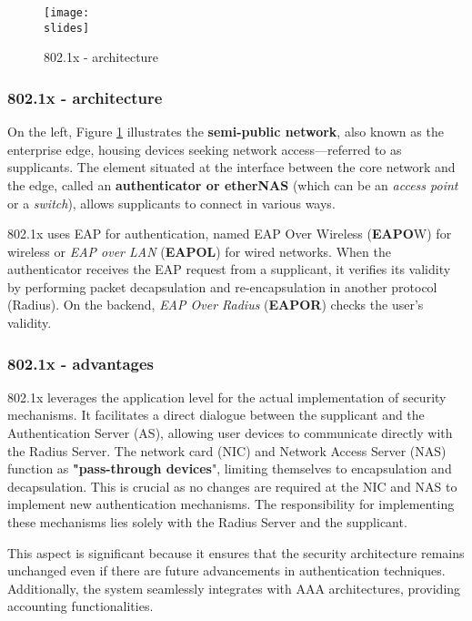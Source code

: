 \begin{figure}[h]
    \centering
    \texttt{[image: \\slides]}
    \caption{802.1x - architecture}
    \label{fig:802.1x-architecture}
\end{figure}

\subsubsection{802.1x - architecture}
On the left, Figure \ref{fig:802.1x-architecture} illustrates the \textbf{semi-public network}, also known as the enterprise edge, housing devices seeking network access—referred to as supplicants. The element situated at the interface between the core network and the edge, called an \textbf{authenticator or etherNAS} (which can be an \textit{access point} or a \textit{switch}), allows supplicants to connect in various ways.

802.1x uses EAP for authentication, named EAP Over Wireless\textit{} (\textbf{EAPO}W) for wireless or \textit{EAP over LAN} (\textbf{EAPOL}) for wired networks. When the authenticator receives the EAP request from a supplicant, it verifies its validity by performing packet decapsulation and re-encapsulation in another protocol (Radius). On the backend, \textit{EAP Over Radius} (\textbf{EAPOR}) checks the user's validity.


\subsubsection{802.1x - advantages}

802.1x leverages the application level for the actual implementation of security mechanisms. It facilitates a direct dialogue between the supplicant and the Authentication Server (AS), allowing user devices to communicate directly with the Radius Server. The network card (NIC) and Network Access Server (NAS) function as \textbf{"pass-through devices}", limiting themselves to encapsulation and decapsulation. This is crucial as no changes are required at the NIC and NAS to implement new authentication mechanisms. The responsibility for implementing these mechanisms lies solely with the Radius Server and the supplicant.

This aspect is significant because it ensures that the security architecture remains unchanged even if there are future advancements in authentication techniques. Additionally, the system seamlessly integrates with AAA architectures, providing accounting functionalities.


